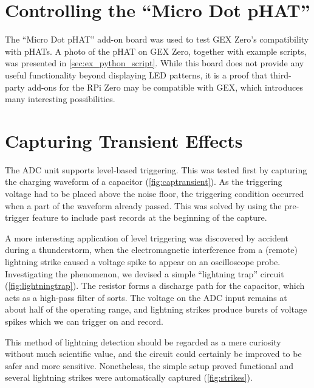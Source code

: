 \section{Controlling the ``Micro Dot pHAT''}

The ``Micro Dot pHAT'' add-on board was used to test GEX Zero's compatibility with pHATs. A photo of the pHAT on GEX Zero, together with example scripts, was presented in \cref{sec:ex_python_script}. While this board does not provide any useful functionality beyond displaying \gls{LED} patterns, it is a proof that third-party add-ons for the RPi Zero may be compatible with GEX, which introduces many interesting possibilities.

\section{Capturing Transient Effects}

The \gls{ADC} unit supports level-based triggering. This was tested first by capturing the charging waveform of a capacitor (\cref{fig:captransient}). As the triggering voltage had to be placed above the noise floor, the triggering condition occurred when a part of the waveform already passed. This was solved by using the pre-trigger feature to include past records at the beginning of the capture.

A more interesting application of level triggering was discovered by accident during a thunderstorm, when the electromagnetic interference from a (remote) lightning strike caused a voltage spike to appear on an oscilloscope probe. Investigating the phenomenon, we devised a simple ``lightning trap'' circuit (\cref{fig:lightningtrap}). The resistor forms a discharge path for the capacitor, which acts as a high-pass filter of sorts. The voltage on the \gls{ADC} input remains at about half of the operating range, and lightning strikes produce bursts of voltage spikes which we can trigger on and record.

This method of lightning detection should be regarded as a mere curiosity without much scientific value, and the circuit could certainly be improved to be safer and more sensitive. Nonetheless, the simple setup proved functional and several lightning strikes were automatically captured (\cref{fig:strikes}). 


